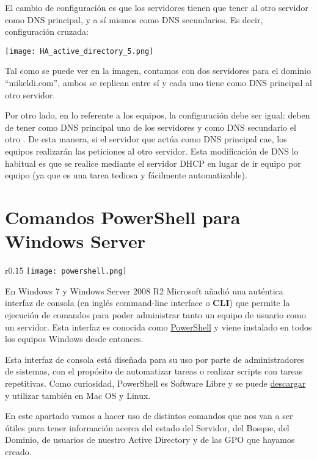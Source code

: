 El cambio de configuración es que los servidores tienen que tener al otro servidor como DNS principal, y a sí mismos como DNS secundarios. Es decir, configuración cruzada:

\begin{center}
    \vspace{-10pt}
    \texttt{[image: HA\_active\_directory\_5.png]}
\end{center}

Tal como se puede ver en la imagen, contamos con dos servidores para el dominio “mikeldi.com”, ambos se replican entre sí y cada uno tiene como DNS principal al otro servidor.

Por otro lado, en lo referente a los equipos, la configuración debe ser igual: deben de tener como DNS principal uno de los servidores y como DNS secundario el otro . De esta manera, si el servidor que actúa como DNS principal cae, los equipos realizarán las peticiones al otro servidor. Esta modificación de DNS lo habitual es que se realice mediante el servidor DHCP en lugar de ir equipo por equipo (ya que es una tarea tediosa y fácilmente automatizable).


\chapter{Comandos PowerShell para Windows Server}
\begin{wrapfigure}{r}{0.15\linewidth}
    \centering
    \vspace{-20pt}
    \texttt{[image: powershell.png]}
    \vspace{-40pt}
\end{wrapfigure}
En Windows 7 y Windows Server 2008 R2 Microsoft añadió una auténtica  interfaz de consola (en inglés command-line interface o \textbf{CLI}) que permite la ejecución de comandos para poder administrar tanto un equipo de usuario como un servidor. Esta interfaz es conocida como \href{https://en.wikipedia.org/wiki/PowerShell}{PowerShell} y viene instalado en todos los equipos  Windows desde entonces.

Esta interfaz de consola está diseñada para su uso por parte de administradores de sistemas, con el propósito de automatizar tareas o realizar scripts con tareas repetitivas. Como curiosidad, PowerShell es Software Libre y se puede \href{https://github.com/PowerShell/PowerShell}{descargar} y utilizar también en Mac OS y Linux.

En este apartado vamos a hacer uso de  distintos comandos que nos van a ser útiles para tener información acerca del estado del Servidor, del Bosque, del Dominio, de usuarios de nuestro Active Directory y de las GPO que hayamos creado.

